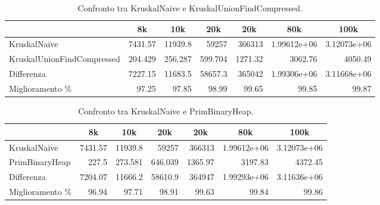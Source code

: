 \begin{table}[H]
\centering
    \hspace*{-1cm}
    \begin{tabular}{|l|rrrrrr|}
    \hline
    &  \multicolumn{1}{c}{8k} & \multicolumn{1}{c}{10k} & \multicolumn{1}{c}{20k} & \multicolumn{1}{c}{20k} & \multicolumn{1}{c}{80k} &           \multicolumn{1}{c|}{100k} \\
    \hline
     KruskalNaive               & 7431.57  & 11939.8   & 59257     & 366313    &    1.99612e+06 &    3.12073e+06 \\
     KruskalUnionFindCompressed &  204.429 &   256.287 &   599.704 &   1271.32 & 3062.76        & 4050.49        \\ \hline
     Differenza                 & 7227.15  & 11683.5   & 58657.3   & 365042    &    1.99306e+06 &    3.11668e+06 \\
     Miglioramento \%              &   97.25  &    97.85  &    98.99  &     99.65 &   99.85        &   99.87        \\
    \hline
    \end{tabular}
    \caption{Confronto tra KruskalNaive e KruskalUnionFindCompressed.}
    \label{table:kruskal-simple-vs-kruskal-union-find-compressed}
\end{table}

\begin{table}[H]
\centering
    \begin{tabular}{|l|rrrrrr|}
    \hline
    &  \multicolumn{1}{c}{8k} & \multicolumn{1}{c}{10k} & \multicolumn{1}{c}{20k} & \multicolumn{1}{c}{20k} & \multicolumn{1}{c}{80k} &           \multicolumn{1}{c|}{100k} \\
    \hline
     KruskalNaive   & 7431.57 & 11939.8   & 59257     & 366313    &    1.99612e+06 &    3.12073e+06 \\
     PrimBinaryHeap &  227.5  &   273.581 &   646.039 &   1365.97 & 3197.83        & 4372.45        \\ \hline
     Differenza     & 7204.07 & 11666.2   & 58610.9   & 364947    &    1.99293e+06 &    3.11636e+06 \\
     Miglioramento \%  &   96.94 &    97.71  &    98.91  &     99.63 &   99.84        &   99.86        \\
    \hline
    \end{tabular}
    \caption{Confronto tra KruskalNaive e PrimBinaryHeap.}
    \label{table:kruskal-simple-vs-prim-binary-heap}
\end{table}


